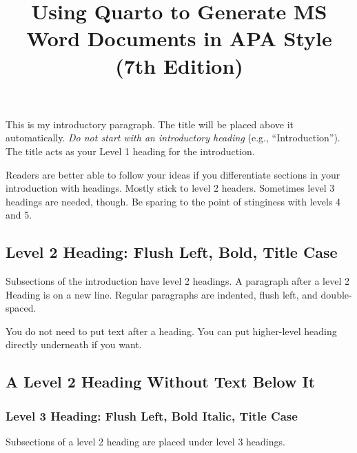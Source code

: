 \documentclass[
  floatsintext,
  man,
  colorlinks=true,linkcolor=blue,citecolor=blue,urlcolor=blue,biblatex]{apa7}
\title{Using Quarto to Generate MS Word Documents in APA Style (7th
Edition)}
\date{}
\begin{document}
\maketitle
\ifdefined\Shaded\renewenvironment{Shaded}{\begin{tcolorbox}[borderline west={3pt}{0pt}{shadecolor}, interior hidden, breakable, boxrule=0pt, enhanced, sharp corners, frame hidden]}{\end{tcolorbox}}\fi
This is my introductory paragraph. The title will be placed above it
automatically. \emph{Do not start with an introductory heading} (e.g.,
``Introduction''). The title acts as your Level 1 heading for the
introduction.

Readers are better able to follow your ideas if you differentiate
sections in your introduction with headings. Mostly stick to level 2
headers. Sometimes level 3 headings are needed, though. Be sparing to
the point of stinginess with levels 4 and 5.

\hypertarget{level-2-heading-flush-left-bold-title-case}{%
\subsection{Level 2 Heading: Flush Left, Bold, Title
Case}\label{level-2-heading-flush-left-bold-title-case}}

Subsections of the introduction have level 2 headings. A paragraph after
a level 2 Heading is on a new line. Regular paragraphs are indented,
flush left, and double-spaced.

You do not need to put text after a heading. You can put higher-level
heading directly underneath if you want.

\hypertarget{a-level-2-heading-without-text-below-it}{%
\subsection{A Level 2 Heading Without Text Below
It}\label{a-level-2-heading-without-text-below-it}}

\hypertarget{level-3-heading-flush-left-bold-italic-title-case}{%
\subsubsection{Level 3 Heading: Flush Left, Bold Italic, Title
Case}\label{level-3-heading-flush-left-bold-italic-title-case}}

Subsections of a level 2 heading are placed under level 3 headings.
\end{document}

